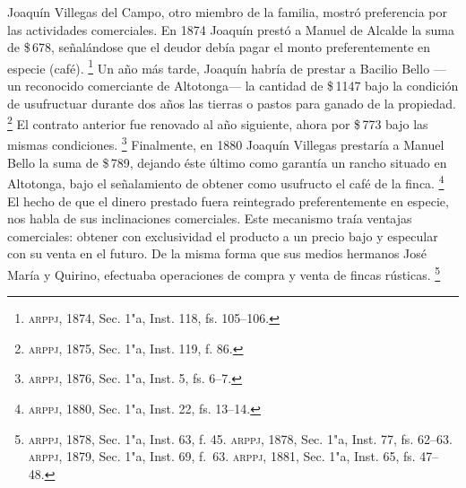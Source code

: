 \documentclass[14pt,twoside,final]{extbook} %
\let\oldfootnote\footnote
\renewcommand\footnote[1]{%
\oldfootnote{\hspace{1mm}#1}}
\begin{document}
Joaquín Villegas del Campo, otro miembro de la familia, mostró preferencia por las actividades comerciales. En 1874 Joaquín prestó a Manuel de Alcalde la suma de \$\,678, señalándose que el deudor debía pagar el monto preferentemente en especie (café).\footnote{\textsc{arppj}, 1874, Sec. 1"a, Inst. 118, fs. 105--106.} Un año más tarde, Joaquín habría de prestar a Bacilio Bello ---un reconocido comerciante de Altotonga--- la cantidad de \$\,1147 bajo la condición de usufructuar durante dos años las tierras o pastos para ganado de la propiedad.\footnote{\textsc{arppj}, 1875, Sec. 1"a, Inst. 119, f. 86.} El contrato anterior fue renovado al año siguiente, ahora por \$\,773 bajo las mismas condiciones.\footnote{\textsc{arppj}, 1876, Sec. 1"a, Inst. 5, fs. 6--7.} Finalmente, en 1880 Joaquín Villegas prestaría a Manuel Bello la suma de \$\,789, dejando éste último como garantía un rancho situado en Altotonga, bajo el señalamiento de obtener como usufructo el café de la finca.\footnote{\textsc{arppj}, 1880, Sec. 1"a, Inst. 22, fs. 13--14.} El hecho de que el dinero prestado fuera reintegrado preferentemente en especie, nos habla de sus inclinaciones comerciales. Este mecanismo traía ventajas comerciales: obtener con exclusividad el producto a un precio bajo y especular con su venta en el futuro. De la misma forma que sus medios hermanos José María y Quirino, efectuaba operaciones de compra y venta de fincas rústicas.\footnote{\textsc{arppj}, 1878, Sec. 1"a, Inst. 63, f. 45. \textsc{arppj}, 1878, Sec. 1"a, Inst. 77, fs. 62--63. \textsc{arppj}, 1879, Sec. 1"a, Inst. 69, f.~63. \textsc{arppj}, 1881, Sec. 1"a, Inst. 65, fs. 47--48.}
\end{document}
